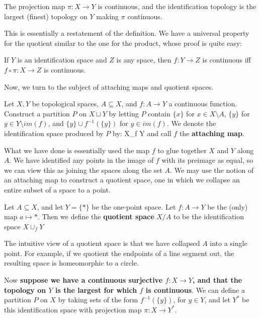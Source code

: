 	\begin{theorem}
		The projection map $\pi : X\rightarrow Y$ is continuous, and the identification topology is the largest (finest) topology on $Y$ making $\pi$ continuous.
	\end{theorem}
	
	This is essentially a restatement of the definition. We have a universal property for the quotient similar to the one for the product, whose proof is quite 
	easy:
	
	\begin{theorem}
		If $Y$ is an identification space and $Z$ is any space, then $f : Y\rightarrow Z$ is continuous iff $f\circ\pi : X\rightarrow Z$ is continuous. 
	\end{theorem}
	
	Now, we turn to the subject of attaching maps and quotient spaces. 
	
	\begin{definition}
		Let $X, Y$ be topological spaces, $A\subseteq X$, and $f : A\rightarrow Y$ a continuous function. Construct a partition $P$ on $X\sqcup Y$ by 
		letting $P$ contain $\{x\}$ for $x\in X\setminus A$, $\{y\}$ for $y\in Y\setminus im(f)$, and $\{y\}\cup f^{-1}(\{y\})$ for $y\in im(f)$. We denote the 
		identification space produced by $P$ by:
		\eq
			X\cup_f Y
		\qe
		and call $f$ the \textbf{attaching map}.
	\end{definition}
	
	What we have done is essentially used the map $f$ to glue together $X$ and $Y$ along $A$. We have identified any points in the image of $f$ with its 
	preimage as equal, so we can view this as joining the spaces along the set $A$. We may use the notion of an attaching map to construct a quotient space, 
	one in which we collapse an entire subset of a space to a point.
	
	\begin{definition}
		Let $A\subseteq X$, and let $Y = \{*\}$ be the one-point space. Let $f : A\rightarrow Y$ be the (only) map $a\mapsto *$. Then we define the 
		\textbf{quotient space} $X / A$ to be the identification space $X\cup_f Y$
	\end{definition}
	
	The intuitive view of a quotient space is that we have collapsed $A$ into a single point. For example, if we quotient the endpoints of a line segment out, 
	the resulting space is homeomorphic to a circle. 
	
	Now \textbf{suppose we have a continuous surjective $f : X\rightarrow Y$, and that the topology on $Y$ is the largest for which $f$ is continuous}. We can 
	define a partition $P$ on $X$ by taking sets of the form $f^{-1}(\{y\})$, for $y\in Y$, and let $Y^*$ be this identification space with projection map $\pi : X
	\rightarrow Y^*$. 
	
